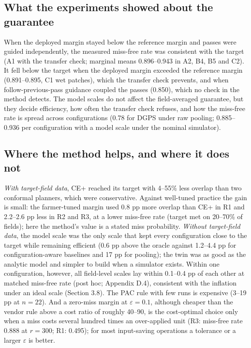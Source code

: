 \documentclass[preprint,12pt,authoryear]{elsarticle}
\begin{document}
\subsection{What the experiments showed about the guarantee}

When the deployed margin stayed below the reference margin and passes were guided independently, the measured miss-free rate was consistent with the target (A1 with the transfer check; marginal means 0.896--0.943 in A2, B4, B5 and C2). It fell below the target when the deployed margin exceeded the reference margin (0.891--0.895, C1 wet patches), which the transfer check prevents, and when follow-previous-pass guidance coupled the passes (0.850), which no check in the method detects. The model scales do not affect the field-averaged guarantee, but they decide efficiency, how often the transfer check refuses, and how the miss-free rate is spread across configurations (0.78 for DGPS under raw pooling; 0.885--0.936 per configuration with a model scale under the nominal simulator).

\subsection{Where the method helps, and where it does not}

\emph{With target-field data}, CE+ reached its target with 4--55\% less overlap than two conformal planners, which were conservative. Against well-tuned practice the gain is small: the farmer-tuned margin used 0.8 pp more overlap than CE+ in R1 and 2.2--2.6 pp less in R2 and R3, at a lower miss-free rate (target met on 20--70\% of fields); here the method's value is a stated miss probability. \emph{Without target-field data}, the model scale was the only scale that kept every configuration close to the target while remaining efficient (0.6 pp above the oracle against 1.2--4.4 pp for configuration-aware baselines and 17 pp for pooling); the twin was as good as the analytic model and simpler to build when a simulator exists. Within one configuration, however, all field-level scales lay within 0.1--0.4 pp of each other at matched miss-free rate (post hoc; Appendix D.4), consistent with the inflation under an ideal scale (Section 3.8). The PAC rule with few runs is expensive (3--19 pp at \(n=22\)). And a zero-miss margin at \(\varepsilon=0.1\), although cheaper than the vendor rule above a cost ratio of roughly 40--90, is the cost-optimal choice only when a miss costs several hundred times an over-applied unit (R3: miss-free rate 0.888 at \(r=300\); R1: 0.495); for most input-saving operations a tolerance or a larger \(\varepsilon\) is better.
\end{document}
